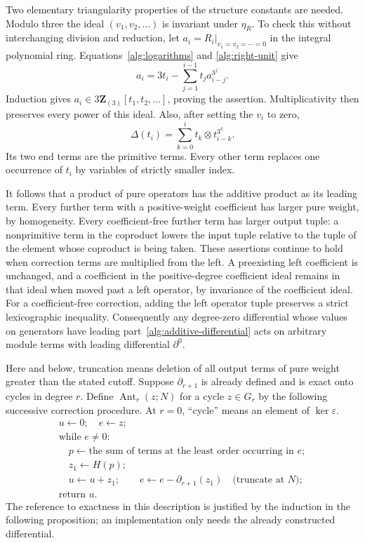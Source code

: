 \documentclass[11pt]{article}
\theoremstyle{definition}
\theoremstyle{remark}
\numberwithin{equation}{section}
\begin{document}
Two elementary triangularity properties of the structure constants
are needed.  Modulo three the ideal $(v_1,v_2,\ldots)$ is invariant
under $\eta_R$.  To check this without interchanging division and
reduction, let $a_i=R_i|_{v_1=v_2=\cdots=0}$ in the integral
polynomial ring.  Equations~\eqref{alg:logarithms} and
\eqref{alg:right-unit} give
\[
 a_i=3t_i-\sum_{j=1}^{i-1}t_j a_{i-j}^{3^j}.
\]
Induction gives $a_i\in3\mathbf Z_{(3)}[t_1,t_2,\ldots]$, proving the
assertion.  Multiplicativity then preserves every power of this ideal.
Also, after setting the $v_i$ to zero,
\begin{equation}\label{alg:coefficient-free-coproduct}
 \Delta(t_i)=\sum_{k=0}^{i}t_k\otimes t_{i-k}^{3^k}.
\end{equation}
Its two end terms are the primitive terms.  Every other term replaces
one occurrence of $t_i$ by variables of strictly smaller index.

It follows that a product of pure operators has the additive product
as its leading term.  Every further term with a positive-weight coefficient
has larger pure weight, by homogeneity.  Every coefficient-free further
term has larger output tuple: a nonprimitive term in the coproduct
lowers the input tuple relative to the tuple of the element whose
coproduct is being taken.  These assertions continue to hold when
correction terms are multiplied from the left.  A preexisting left
coefficient is unchanged, and a coefficient in the positive-degree
coefficient ideal remains in that ideal when moved past a left operator, by invariance
of the coefficient ideal.  For a coefficient-free correction, adding
the left operator tuple preserves a strict lexicographic inequality.
Consequently any degree-zero differential whose values on generators
have leading part~\eqref{alg:additive-differential} acts on arbitrary
module terms with leading differential $\partial^0$.

Here and below, truncation means deletion of all output terms of pure
weight greater than the stated cutoff.  Suppose $\partial_{r+1}$ is
already defined and is exact onto cycles in degree $r$.  Define
$\operatorname{Ant}_r(z;N)$ for a cycle $z\in G_r$ by the following
successive correction procedure.  At $r=0$, ``cycle'' means an element
of $\ker\varepsilon$.
\begin{equation}\label{alg:antidifferential}
\begin{array}{l}
 u\leftarrow0;\quad e\leftarrow z;\\
 \text{while }e\ne0:\\
 \quad p\leftarrow\text{the sum of terms at the least order occurring in }e;\\
 \quad z_1\leftarrow H(p);\\
 \quad u\leftarrow u+z_1;\qquad
 e\leftarrow e-\partial_{r+1}(z_1)\quad\text{(truncate at }N\text{)};\\
 \text{return }u.
\end{array}
\end{equation}
The reference to exactness in this description is justified by the
induction in the following proposition; an implementation only needs
the already constructed differential.
\end{document}
